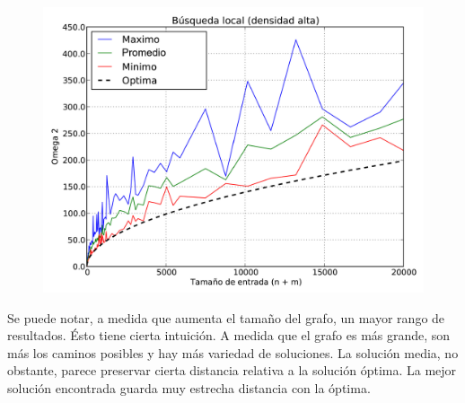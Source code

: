 \begin{figure}[H]
\begin{center}
\includegraphics[angle=0, scale=.75]{imagenes/local_search_densidad_alta.pdf}
\label{grafico local}
\end{center}
\end{figure}

Se puede notar, a medida que aumenta el tamaño del grafo, un mayor rango de resultados. Ésto tiene cierta intuición. A medida que el grafo es
más grande, son más los caminos posibles y hay más variedad de soluciones. La solución media, no obstante, parece preservar cierta distancia
relativa a la solución óptima. La mejor solución encontrada guarda muy estrecha distancia con la óptima.

